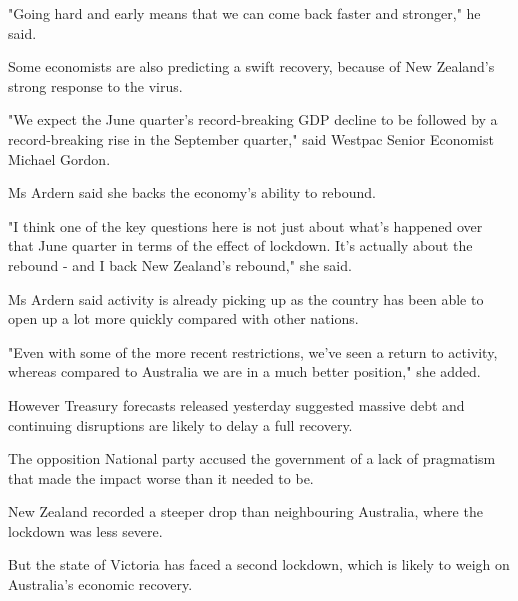 \documentclass[a4paper,12pt]{article}
\begin{document}
"Going hard and early means that we can come back faster and stronger," he said.

Some economists are also predicting a swift recovery, because of New Zealand's strong response to the virus.

"We expect the June quarter's record-breaking GDP decline to be followed by a record-breaking rise in the September quarter," said Westpac Senior Economist Michael Gordon.

Ms Ardern said she backs the economy's ability to rebound.

"I think one of the key questions here is not just about what's happened over that June quarter in terms of the effect of lockdown. It's actually about the rebound - and I back New Zealand's rebound," she said.

Ms Ardern said activity is already picking up as the country has been able to open up a lot more quickly compared with other nations.

"Even with some of the more recent restrictions, we've seen a return to activity, whereas compared to Australia we are in a much better position," she added.

However Treasury forecasts released yesterday suggested massive debt and continuing disruptions are likely to delay a full recovery.

The opposition National party accused the government of a lack of pragmatism that made the impact worse than it needed to be.

New Zealand recorded a steeper drop than neighbouring Australia, where the lockdown was less severe.

But the state of Victoria has faced a second lockdown, which is likely to weigh on Australia's economic recovery.

\newpage






\end{document}
